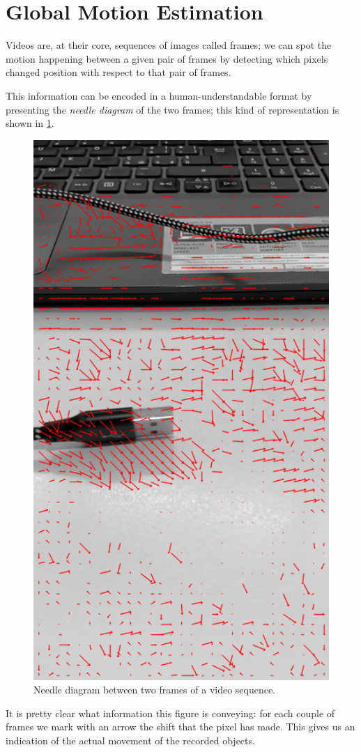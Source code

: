 \section{Global Motion Estimation}
\label{sec:02-gme}
Videos are, at their core, sequences of images called frames; we can spot the motion happening between a given pair of frames by detecting which pixels changed position with respect to that pair of frames.

This information can be encoded in a human-understandable format by presenting the \textit{needle diagram} of the two frames; this kind of representation is shown in \cref{fig:needle-diagram}.

\begin{figure}
    \centering
    \includegraphics[width=.7\linewidth]{../assets/images/bbme-0-res.png}
    \caption{Needle diagram between two frames of a video sequence.}
    \label{fig:needle-diagram}
\end{figure}

It is pretty clear what information this figure is conveying: for each couple of frames we mark with an arrow the shift that the pixel has made. This gives us an indication of the actual movement of the recorded objects.

